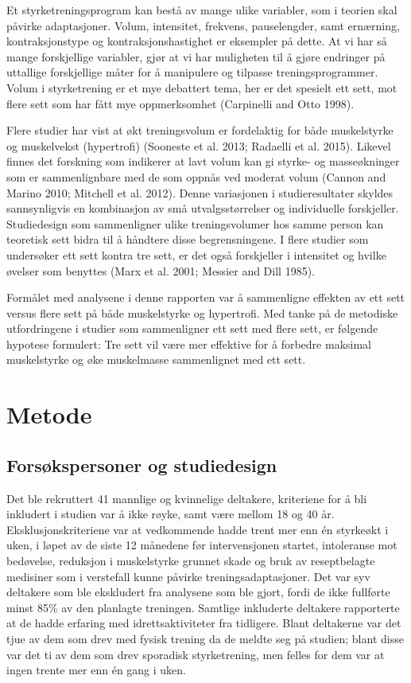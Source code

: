 \documentclass[
  letterpaper,
  DIV=11,
  numbers=noendperiod]{scrreprt}
\begin{document}
Et styrketreningsprogram kan bestå av mange ulike variabler, som i
teorien skal påvirke adaptasjoner. Volum, intensitet, frekvens,
pauselengder, samt ernærning, kontraksjonstype og kontraksjonshastighet
er eksempler på dette. At vi har så mange forskjellige variabler, gjør
at vi har muligheten til å gjøre endringer på uttallige forskjellige
måter for å manipulere og tilpasse treningsprogrammer. Volum i
styrketrening er et mye debattert tema, her er det spesielt ett sett,
mot flere sett som har fått mye oppmerksomhet (Carpinelli and Otto
1998).

Flere studier har vist at økt treningsvolum er fordelaktig for både
muskelstyrke og muskelvekst (hypertrofi) (Sooneste et al. 2013; Radaelli
et al. 2015). Likevel finnes det forskning som indikerer at lavt volum
kan gi styrke- og masseøkninger som er sammenlignbare med de som oppnås
ved moderat volum (Cannon and Marino 2010; Mitchell et al. 2012). Denne
variasjonen i studieresultater skyldes sannsynligvis en kombinasjon av
små utvalgsstørrelser og individuelle forskjeller. Studiedesign som
sammenligner ulike treningsvolumer hos samme person kan teoretisk sett
bidra til å håndtere disse begrensningene. I flere studier som
undersøker ett sett kontra tre sett, er det også forskjeller i
intensitet og hvilke øvelser som benyttes (Marx et al. 2001; Messier and
Dill 1985).

Formålet med analysene i denne rapporten var å sammenligne effekten av
ett sett versus flere sett på både muskelstyrke og hypertrofi. Med tanke
på de metodiske utfordringene i studier som sammenligner ett sett med
flere sett, er følgende hypotese formulert: Tre sett vil være mer
effektive for å forbedre maksimal muskelstyrke og øke muskelmasse
sammenlignet med ett sett.

\section{Metode}\label{metode-5}

\subsection{Forsøkspersoner og
studiedesign}\label{forsuxf8kspersoner-og-studiedesign}

Det ble rekruttert 41 mannlige og kvinnelige deltakere, kriteriene for å
bli inkludert i studien var å ikke røyke, samt være mellom 18 og 40 år.
Eksklusjonskriteriene var at vedkommende hadde trent mer enn én
styrkeøkt i uken, i løpet av de siste 12 månedene før intervensjonen
startet, intoleranse mot bedøvelse, reduksjon i muskelstyrke grunnet
skade og bruk av reseptbelagte medisiner som i verstefall kunne påvirke
treningsadaptasjoner. Det var syv deltakere som ble ekskludert fra
analysene som ble gjort, fordi de ikke fullførte minst 85\% av den
planlagte treningen. Samtlige inkluderte deltakere rapporterte at de
hadde erfaring med idrettsaktiviteter fra tidligere. Blant deltakerne
var det tjue av dem som drev med fysisk trening da de meldte seg på
studien; blant disse var det ti av dem som drev sporadisk styrketrening,
men felles for dem var at ingen trente mer enn én gang i uken.
\end{document}
